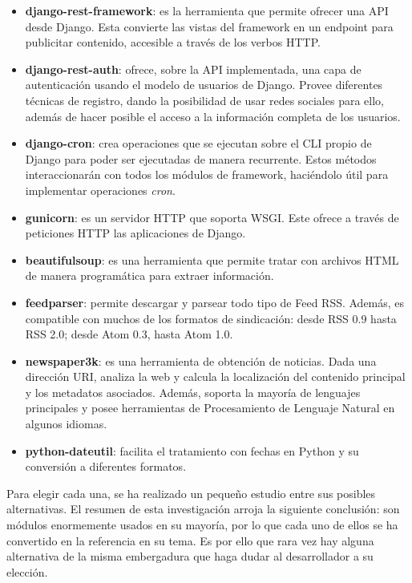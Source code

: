 \begin{itemize}
    \item \textbf{django-rest-framework}: es la herramienta que permite ofrecer una API desde Django. Esta convierte las vistas del framework en un endpoint para publicitar contenido, accesible a través de los verbos HTTP.
    \item \textbf{django-rest-auth}: ofrece, sobre la API implementada, una capa de autenticación usando el modelo de usuarios de Django. Provee diferentes técnicas de registro, dando la posibilidad de usar redes sociales para ello, además de hacer posible el acceso a la información completa de los usuarios.
    \item \textbf{django-cron}: crea operaciones que se ejecutan sobre el CLI propio de Django para poder ser ejecutadas de manera recurrente. Estos métodos interaccionarán con todos los módulos de framework, haciéndolo útil para implementar operaciones \textit{cron}.
    \item \textbf{gunicorn}: es un servidor HTTP que soporta WSGI. Este ofrece a través de peticiones HTTP las aplicaciones de Django. 
    \item \textbf{beautifulsoup}: es una herramienta que permite tratar con archivos HTML de manera programática para extraer información.
    \item \textbf{feedparser}: permite descargar y parsear todo tipo de Feed RSS. Además, es compatible con muchos de los formatos de sindicación: desde RSS 0.9 hasta RSS 2.0; desde Atom 0.3, hasta Atom 1.0.
    \item \textbf{newspaper3k}: es una herramienta de obtención de noticias. Dada una dirección URI, analiza la web y calcula la localización del contenido principal y los metadatos asociados. Además, soporta la mayoría de lenguajes principales y posee herramientas de Procesamiento de Lenguaje Natural en algunos idiomas.
    \item \textbf{python-dateutil}: facilita el tratamiento con fechas en Python y su conversión a diferentes formatos.
\end{itemize}

Para elegir cada una, se ha realizado un pequeño estudio entre sus posibles alternativas. El resumen de esta investigación arroja la siguiente conclusión: son módulos enormemente usados en su mayoría, por lo que cada uno de ellos se ha convertido en la referencia en su tema. Es por ello que rara vez hay alguna alternativa de la misma embergadura que haga dudar al desarrollador a su elección.

